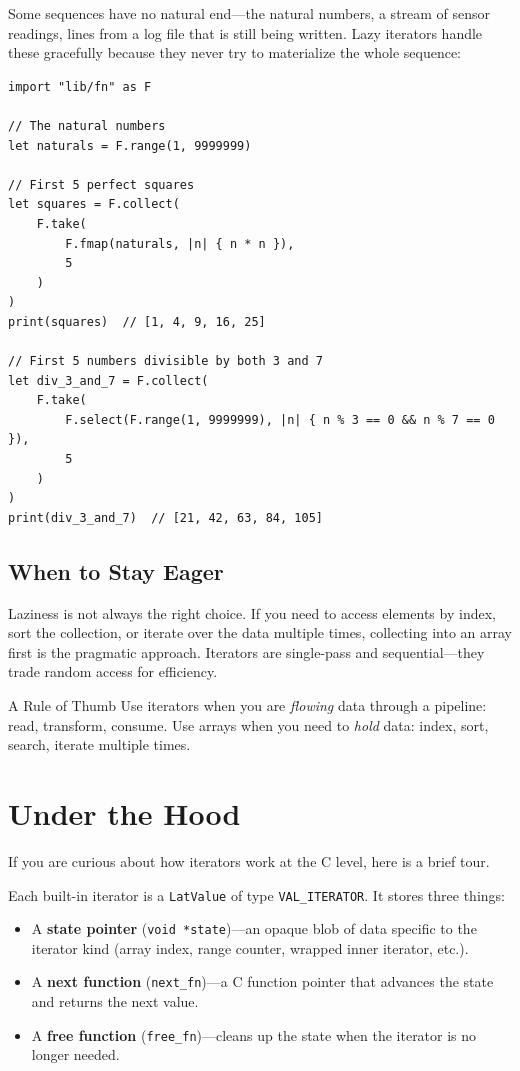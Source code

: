 Some sequences have no natural end---the natural numbers, a stream of sensor readings, lines from a log file that is still being written.
Lazy iterators handle these gracefully because they never try to materialize the whole sequence:

\begin{lstlisting}[language=Lattice, caption={Working with infinite sequences}]
import "lib/fn" as F

// The natural numbers
let naturals = F.range(1, 9999999)

// First 5 perfect squares
let squares = F.collect(
    F.take(
        F.fmap(naturals, |n| { n * n }),
        5
    )
)
print(squares)  // [1, 4, 9, 16, 25]

// First 5 numbers divisible by both 3 and 7
let div_3_and_7 = F.collect(
    F.take(
        F.select(F.range(1, 9999999), |n| { n % 3 == 0 && n % 7 == 0 }),
        5
    )
)
print(div_3_and_7)  // [21, 42, 63, 84, 105]
\end{lstlisting}

\subsection{When to Stay Eager}\label{subsec:when-eager}

Laziness is not always the right choice.
If you need to access elements by index, sort the collection, or iterate over the data multiple times, collecting into an array first is the pragmatic approach.
Iterators are single-pass and sequential---they trade random access for efficiency.

\begin{tipbox}{A Rule of Thumb}
Use iterators when you are \emph{flowing} data through a pipeline: read, transform, consume.
Use arrays when you need to \emph{hold} data: index, sort, search, iterate multiple times.
\end{tipbox}

\section{Under the Hood}\label{sec:iterator-internals}

If you are curious about how iterators work at the C level, here is a brief tour.

Each built-in iterator is a \lstinline|LatValue| of type \lstinline|VAL_ITERATOR|.
It stores three things:
\begin{itemize}[nosep]
  \item A \textbf{state pointer} (\lstinline|void *state|)---an opaque blob of data specific to the iterator kind (array index, range counter, wrapped inner iterator, etc.).
  \item A \textbf{next function} (\lstinline|next_fn|)---a C function pointer that advances the state and returns the next value.
  \item A \textbf{free function} (\lstinline|free_fn|)---cleans up the state when the iterator is no longer needed.
\end{itemize}


